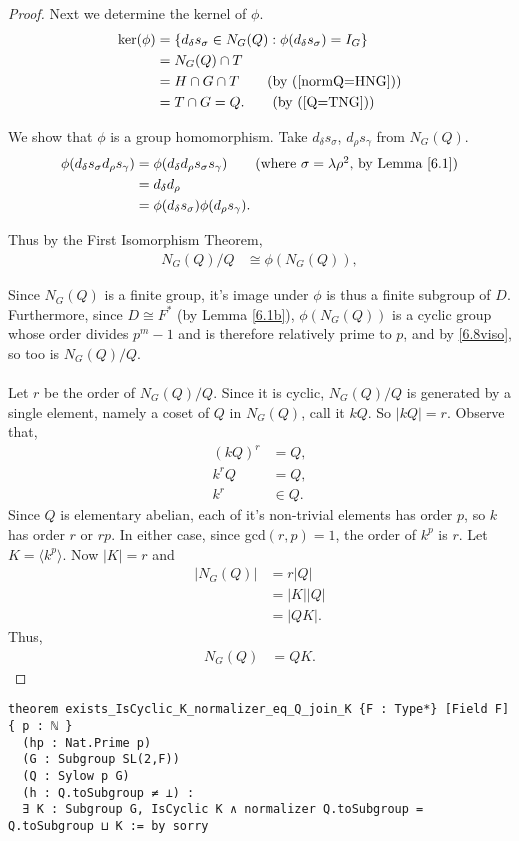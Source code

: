 \begin{proof}
Next we determine the kernel of $\phi$.
\begin{align*} \ker(\phi) &= \{ d_\delta s_\sigma \in N_G(Q) : \phi(d_\delta s_\sigma) = I_G \}
\\ &= N_G(Q) \cap T
\\ &= H \cap G \cap T \tag{by (\ref{normQ=HNG})}
\\ &= T \cap G = Q. \tag{by (\ref{Q=TNG})}
\end{align*}

We show that $\phi$ is a group homomorphism. Take $d_\delta s_\sigma$, $d_\rho s_\gamma$ from $ N_G(Q)$.
\begin{align*} \phi(d_\delta s_\sigma d_\rho s_\gamma) &= \phi(d_\delta d_\rho s_\sigma s_\gamma) \tag{where $\sigma = \lambda \rho^2$, by Lemma \ref{6.1}}
\\ &= d_\delta d_\rho
\\ &= \phi(d_\delta s_\sigma) \phi(d_\rho s_\gamma).
\end{align*}

Thus by the First Isomorphism Theorem,
\begin{align}\label{6.8viso} N_G(Q) / Q &\cong \phi(N_G(Q)),
\end{align}

Since $N_G(Q)$ is a finite group, it's image under $\phi$ is thus a finite subgroup of $D$. Furthermore, since $D \cong F^*$ (by Lemma \ref{6.1b}), $\phi(N_G(Q))$ is a cyclic group whose order divides $p^m-1$ and is therefore relatively prime to $p$, and by \eqref{6.8viso}, so too is $N_G(Q) / Q$. \\
\\
Let $r$ be the order of $N_G(Q) / Q$. Since it is cyclic, $N_G(Q)/Q$ is generated by a single element, namely a coset of $Q$ in $N_G(Q)$, call it $kQ$. So $|kQ| = r$. Observe that,
\begin{align*} (kQ)^r &= Q,
\\ k^rQ &= Q,
\\ k^r &\in Q.
\end{align*}
Since $Q$ is elementary abelian, each of it's non-trivial elements has order $p$, so $k$ has order $r$ or $rp$. In either case, since gcd$(r,p)=1$, the order of $k^p$ is $r$. Let $K = \langle k^p \rangle$. Now $|K| = r$ and
\begin{align*} |N_G(Q)| &= r|Q|
\\ &= |K||Q|
\\ &= |QK|. \tag{since $Q \cap K = I_G$} 
\end{align*}
Thus,
\begin{align}\label{QK} N_G(Q) &= QK.
\end{align}
\end{proof}
\begin{footnotesize}
\begin{verbatim}
theorem exists_IsCyclic_K_normalizer_eq_Q_join_K {F : Type*} [Field F] { p : ℕ }
  (hp : Nat.Prime p)
  (G : Subgroup SL(2,F))
  (Q : Sylow p G)
  (h : Q.toSubgroup ≠ ⊥) :
  ∃ K : Subgroup G, IsCyclic K ∧ normalizer Q.toSubgroup = Q.toSubgroup ⊔ K := by sorry
\end{verbatim}
\end{footnotesize}



